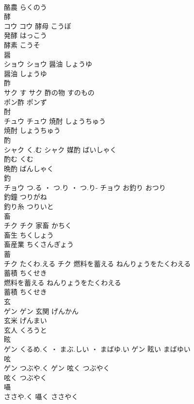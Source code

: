 \documentclass[8pt]{extreport}
\begin{document}
\begin{CJK}{UTF8}{min}
\\	酪農	らくのう	
\\	酵	
\\	コウ		コウ	酵母	こうぼ	
\\	発酵	はっこう	
\\	酵素	こうそ	
\\	醤	
\\	ショウ		ショウ	醤油	しょうゆ	
\\	醤油	しょうゆ	
\\	酢	
\\	サク	す	サク	酢の物	すのもの	
\\	ポン酢	ポンず	
\\	酎	
\\	チュウ		チュウ	焼酎	しょうちゅう	
\\	焼酎	しょうちゅう	
\\	酌	
\\	シャク	く.む	シャク	媒酌	ばいしゃく	
\\	酌む	くむ	
\\	晩酌	ばんしゃく	
\\	釣	
\\	チョウ	つ.る ・ つ.り ・ つ.り-	チョウ													お釣り	おつり	
\\	釣鐘	つりがね	
\\	釣り糸	つりいと	
\\	畜	
\\	チク		チク	家畜	かちく	
\\	畜生	ちくしょう	
\\	畜産業	ちくさんぎょう	
\\	蓄	
\\	チク	たくわ.える	チク	燃料を蓄える	ねんりょうをたくわえる	
\\	蓄積	ちくせき	
\\	燃料を蓄える	ねんりょうをたくわえる	
\\	蓄積	ちくせき	
\\	玄	
\\	ゲン		ゲン	玄関	げんかん	
\\	玄米	げんまい	
\\	玄人	くろうと	
\\	眩	
\\	ゲン	くるめ.く ・ まぶ.しい ・ まばゆ.い	ゲン													眩い	まばゆい	
\\	呟	
\\	ゲン	つぶや.く	ゲン	呟く	つぶやく	
\\	呟く	つぶやく	
\\	囁	
\\	ささや.く														囁く	ささやく	

\end{CJK}
\end{document}
